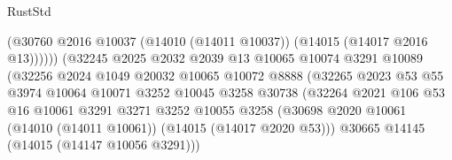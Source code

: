 \begin{lexlean}{RustStd}
\begin{coremodule}
                                            (@30760
                                              @2016
                                              @10037
                                              (@14010 (@14011 @10037))
                                              (@14015 (@14017 @2016 @13))))))
                                      (@32245
                                        @2025
                                        @2032
                                        @2039
                                        @13
                                        @10065
                                        @10074
                                        @3291
                                        @10089
                                        (@32256
                                          @2024
                                          @1049
                                          @20032
                                          @10065
                                          @10072
                                          @8888
                                          (@32265
                                            @2023
                                            @53
                                            @55
                                            @3974
                                            @10064
                                            @10071
                                            @3252
                                            @10045
                                            @3258
                                            @30738
                                            (@32264
                                              @2021
                                              @106
                                              @53
                                              @16
                                              @10061
                                              @3291
                                              @3271
                                              @3252
                                              @10055
                                              @3258
                                              (@30698
                                                @2020
                                                @10061
                                                (@14010 (@14011 @10061))
                                                (@14015 (@14017 @2020 @53)))
                                              @30665
                                              @14145
                                              (@14015 (@14147 @10056 @3291)))

\end{coremodule}
\end{lexlean}
